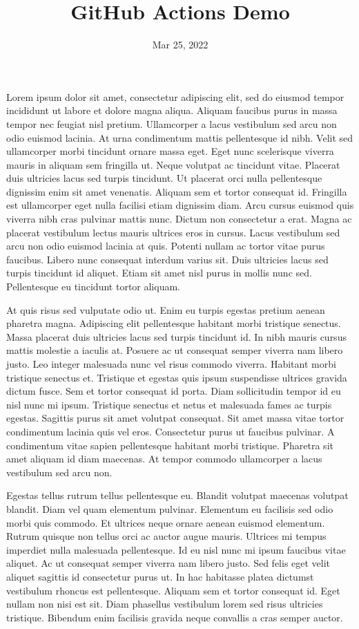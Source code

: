 \documentclass{article}
\title{GitHub Actions Demo}
\author{}
\date{Mar 25, 2022}
\begin{document}
\maketitle

Lorem ipsum dolor sit amet, consectetur adipiscing elit, sed do eiusmod tempor incididunt ut labore et dolore magna aliqua. Aliquam faucibus purus in massa tempor nec feugiat nisl pretium. Ullamcorper a lacus vestibulum sed arcu non odio euismod lacinia. At urna condimentum mattis pellentesque id nibh. Velit sed ullamcorper morbi tincidunt ornare massa eget. Eget nunc scelerisque viverra mauris in aliquam sem fringilla ut. Neque volutpat ac tincidunt vitae. Placerat duis ultricies lacus sed turpis tincidunt. Ut placerat orci nulla pellentesque dignissim enim sit amet venenatis. Aliquam sem et tortor consequat id. Fringilla est ullamcorper eget nulla facilisi etiam dignissim diam. Arcu cursus euismod quis viverra nibh cras pulvinar mattis nunc. Dictum non consectetur a erat. Magna ac placerat vestibulum lectus mauris ultrices eros in cursus. Lacus vestibulum sed arcu non odio euismod lacinia at quis. Potenti nullam ac tortor vitae purus faucibus. Libero nunc consequat interdum varius sit. Duis ultricies lacus sed turpis tincidunt id aliquet. Etiam sit amet nisl purus in mollis nunc sed. Pellentesque eu tincidunt tortor aliquam.

At quis risus sed vulputate odio ut. Enim eu turpis egestas pretium aenean pharetra magna. Adipiscing elit pellentesque habitant morbi tristique senectus. Massa placerat duis ultricies lacus sed turpis tincidunt id. In nibh mauris cursus mattis molestie a iaculis at. Posuere ac ut consequat semper viverra nam libero justo. Leo integer malesuada nunc vel risus commodo viverra. Habitant morbi tristique senectus et. Tristique et egestas quis ipsum suspendisse ultrices gravida dictum fusce. Sem et tortor consequat id porta. Diam sollicitudin tempor id eu nisl nunc mi ipsum. Tristique senectus et netus et malesuada fames ac turpis egestas. Sagittis purus sit amet volutpat consequat. Sit amet massa vitae tortor condimentum lacinia quis vel eros. Consectetur purus ut faucibus pulvinar. A condimentum vitae sapien pellentesque habitant morbi tristique. Pharetra sit amet aliquam id diam maecenas. At tempor commodo ullamcorper a lacus vestibulum sed arcu non.

Egestas tellus rutrum tellus pellentesque eu. Blandit volutpat maecenas volutpat blandit. Diam vel quam elementum pulvinar. Elementum eu facilisis sed odio morbi quis commodo. Et ultrices neque ornare aenean euismod elementum. Rutrum quisque non tellus orci ac auctor augue mauris. Ultrices mi tempus imperdiet nulla malesuada pellentesque. Id eu nisl nunc mi ipsum faucibus vitae aliquet. Ac ut consequat semper viverra nam libero justo. Sed felis eget velit aliquet sagittis id consectetur purus ut. In hac habitasse platea dictumst vestibulum rhoncus est pellentesque. Aliquam sem et tortor consequat id. Eget nullam non nisi est sit. Diam phasellus vestibulum lorem sed risus ultricies tristique. Bibendum enim facilisis gravida neque convallis a cras semper auctor.
\end{document}
